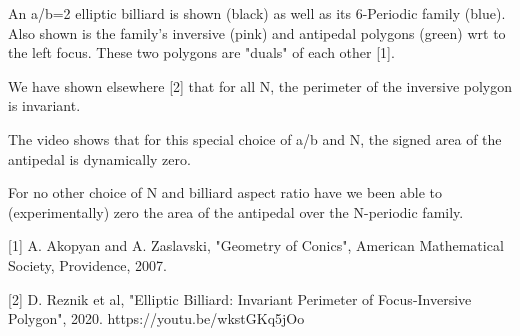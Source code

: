 An a/b=2 elliptic billiard is shown (black) as well as its 6-Periodic family (blue). Also shown is the family's inversive (pink) and antipedal polygons (green) wrt to the left focus. These two polygons are "duals" of each other [1].

We have shown elsewhere [2] that for all N, the perimeter of the inversive polygon is invariant.

The video shows that for this special choice of a/b and N, the signed area of the antipedal is dynamically zero.

For no other choice of N and billiard aspect ratio have we been able to (experimentally) zero the area of the antipedal over the N-periodic family.

[1] A. Akopyan and A. Zaslavski, "Geometry of Conics", American Mathematical Society, Providence, 2007.

[2] D. Reznik et al, "Elliptic Billiard: Invariant Perimeter of Focus-Inversive Polygon", 2020. https://youtu.be/wkstGKq5jOo